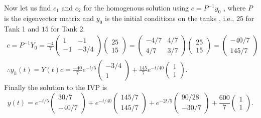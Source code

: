 \documentclass[
	12pt,
	]{article}
\theoremstyle{definition}
\theoremstyle{definition}
\theoremstyle{definition}
\theoremstyle{definition}
\theoremstyle{definition}
\theoremstyle{example}
\theoremstyle{note}
\theoremstyle{remark}
\theoremstyle{example}
\begin{document}
 			 			Now let us find $c_{1}$ and $c_{2}$ for the homogenous solution using $c = P^{-1}y_{0}$ , where $P$ is the eigenvector matrix and $y_0$ is the initial conditions on the tanks , i.e., $25$ for Tank 1 and $15$ for Tank 2.
 			 			\begin{gather*}
 			 				c = P^{-1}Y_{0} = \frac{-4}{7}
 			 				\begin{pmatrix}
 			 					1 & -1 \\
 			 					-1 & -3/4
 			 				\end{pmatrix}
 			 				\begin{pmatrix}
 			 				25 \\
 			 				15
 			 				\end{pmatrix}
 			 				= 
 			 				\begin{pmatrix}
 			 				-4/7 & 4/7 \\
 			 				4/7 & 3/7 
 			 				\end{pmatrix}
 			 				\begin{pmatrix}
 			 					25 \\
 			 					15
 			 				\end{pmatrix}
 			 				=
 			 				\begin{pmatrix}
 			 					-40/7 \\
 			 					145/7
 			 				\end{pmatrix}\\
 			 				\therefore y_{h}(t) = Y(t)c =  \frac{-40}{7}e^{-t/5}
 			 				\begin{pmatrix}
 			 					-3/4 \\
 			 					1
 			 				\end{pmatrix} + \frac{145}{7}e^{-t/40}
 			 				\begin{pmatrix}
 			 					1 \\
 			 					1
 			 				\end{pmatrix}.
 			 			\end{gather*}
 			 			Finally the solution to the IVP is 
 			 			$$ y(t) = e^{-t/5} 
 			 			\begin{pmatrix}
 			 				30/7 \\
 			 				-40/7
 			 			\end{pmatrix} + e^{-t/40} 
 			 			\begin{pmatrix}
 			 				145/7 \\
 			 				145/7
 			 			\end{pmatrix} + e^{-2t/5} 
 			 			\begin{pmatrix}
 			 				90/28\\
 			 				-30/7
 			 			\end{pmatrix}
 			 			+\frac{600}{7} 
 			 			\begin{pmatrix}
 			 				1 \\
 			 				1
 			 			\end{pmatrix}.$$
\end{document}
